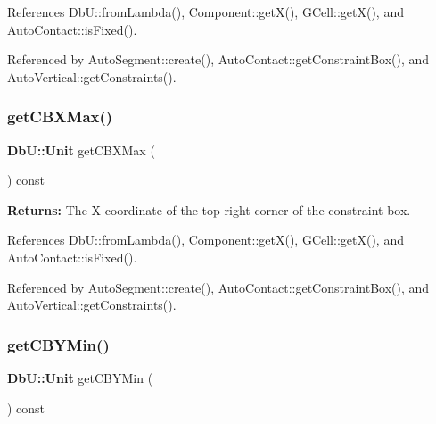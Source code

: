 References Db\+U\+::from\+Lambda(), Component\+::get\+X(), G\+Cell\+::get\+X(), and Auto\+Contact\+::is\+Fixed().



Referenced by Auto\+Segment\+::create(), Auto\+Contact\+::get\+Constraint\+Box(), and Auto\+Vertical\+::get\+Constraints().

\mbox{\label{classKatabatic_1_1AutoContact_a798750f964050c53c269a2e56d44b690}} 
\subsubsection{\texorpdfstring{get\+C\+B\+X\+Max()}{getCBXMax()}}
{\footnotesize\ttfamily \textbf{ Db\+U\+::\+Unit} get\+C\+B\+X\+Max (\begin{DoxyParamCaption}{ }\end{DoxyParamCaption}) const\hspace{0.3cm}{\ttfamily [inline]}}

{\bfseries Returns\+:} The X coordinate of the top right corner of the constraint box. 

References Db\+U\+::from\+Lambda(), Component\+::get\+X(), G\+Cell\+::get\+X(), and Auto\+Contact\+::is\+Fixed().



Referenced by Auto\+Segment\+::create(), Auto\+Contact\+::get\+Constraint\+Box(), and Auto\+Vertical\+::get\+Constraints().

\mbox{\label{classKatabatic_1_1AutoContact_ad7ee1befb03ee85f237a36e2f5ab8e45}} 
\subsubsection{\texorpdfstring{get\+C\+B\+Y\+Min()}{getCBYMin()}}
{\footnotesize\ttfamily \textbf{ Db\+U\+::\+Unit} get\+C\+B\+Y\+Min (\begin{DoxyParamCaption}{ }\end{DoxyParamCaption}) const\hspace{0.3cm}{\ttfamily [inline]}}

